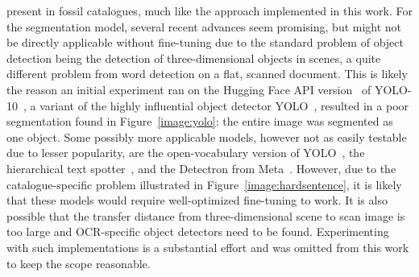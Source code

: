 \documentclass[english,twoside,openright]{UH_DS_MSc}
\begin{document}
present in fossil catalogues, much like the approach implemented in this work.
For the segmentation model, several recent advances seem promising, but might not be directly applicable without fine-tuning 
due to the standard problem of object detection being the detection of three-dimensional objects in scenes, a
quite different problem from word detection on a flat, scanned document. This is likely the reason an initial experiment 
ran on the Hugging Face API version~\cite{OmouredYOLOv10DocumentLayoutAnalysisHugging2023} of YOLO-10~\cite{wang2024yolov10}, a variant of the highly influential object detector YOLO~\cite{redmonYouOnlyLook2016},
resulted in a poor segmentation found in Figure~\ref{image:yolo}: the entire image was segmented as one object.
Some possibly more applicable models, however not as easily testable due to lesser popularity, 
are the open-vocabulary version of YOLO~\cite{YOLOWorldRealTimeOpenVocabulary},
 the hierarchical text spotter~\cite{longHierarchicalTextSpotter2024}, and the Detectron from Meta~\cite{Detectron}.
 However, due to the catalogue-specific problem illustrated in Figure~\ref{image:hardsentence}, it is likely that these 
 models would require well-optimized fine-tuning to work. It is also possible that the transfer distance from three-dimensional scene to scan image is 
 too large and OCR-specific object detectors need to be found. Experimenting with such implementations is a 
 substantial effort and was omitted from this work to keep the scope reasonable.
\end{document}
